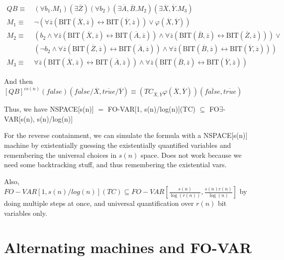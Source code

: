\[
\begin{aligned}
QB \equiv~& (\forall b_{1}.M_{1})(\exists\overline{Z}) (\forall b_{2})(\exists \overline{A}, \overline{B}.M_{2})(\exists\overline{X}, \overline{Y}.M_{3}) \\
M_{1} \equiv~& \neg(\forall \overline{z} (\text{BIT}(\overline{X}, \overline{z}) \leftrightarrow \text{BIT}(\overline{Y}, \overline{z})) \lor \varphi(\overline{X}, \overline{Y})) \\
M_{2} \equiv~&(b_{2} \land \forall \overline{z} (\text{BIT}(\overline{X}, \overline{z}) \leftrightarrow \text{BIT}(\overline{A}, \overline{z}))\land \forall \overline{z} (\text{BIT}(\overline{B}, \overline{z}) \leftrightarrow \text{BIT}(\overline{Z}, \overline{z}))) \lor \\
&(\neg b_{2} \land \forall \overline{z} (\text{BIT}(\overline{Z}, \overline{z}) \leftrightarrow \text{BIT}(\overline{A}, \overline{z}))\land \forall \overline{z} (\text{BIT}(\overline{B}, \overline{z}) \leftrightarrow \text{BIT}(\overline{Y}, \overline{z}))) \\
M_{3} \equiv~&\forall \overline{z} (\text{BIT}(\overline{X}, \overline{z}) \leftrightarrow \text{BIT}(\overline{A}, \overline{z}))\land \forall \overline{z} (\text{BIT}(\overline{B}, \overline{z}) \leftrightarrow \text{BIT}(\overline{Y}, \overline{z}))
\end{aligned}
\]

And then
\([QB]^{cs(n)}(false)(\overline{false} / \overline{X}, \overline{true} / \overline{Y}) \equiv (TC_{\overline{X}, \overline{Y}}\varphi(\overline{X}, \overline{Y}))(\overline{false}, \overline{true})\)

Thus, we have NSPACE{[}s(n){]} \(=\) FO-VAR{[}1, s(n)/log(n){]}(TC)
\(\subseteq\) FO\(\exists\)-VAR{[}s(n), s(n)/log(n){]}

For the reverse containment, we can simulate the formula with a
NSPACE{[}s(n){]} machine by existentially guessing the existentially
quantified variables and remembering the universal choices in \(s(n)\)
space. Does not work because we need some backtracking stuff, and thus
remembering the existential vars.

Also,
\(FO-VAR[1, s(n)/log(n)](TC) \subseteq FO-VAR\left[ \frac{s(n)}{\log(r(n))}, \frac{s(n)r(n)}{\log(n)} \right]\)
by doing multiple steps at once, and universal quantification over
\(r(n)\) bit variables only.

\section{Alternating machines and FO-VAR}\label{sec:somewhat-unrelated-stuff}

